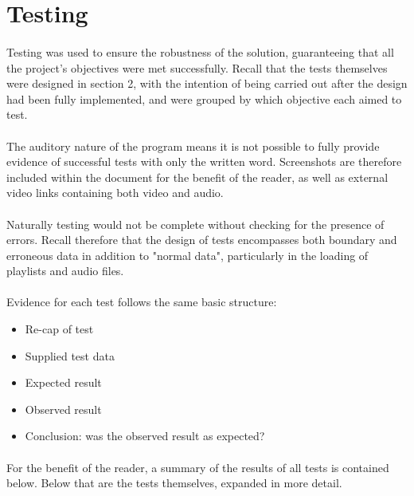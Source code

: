 \section {Testing}
\paragraph{}
Testing was used to ensure the robustness of the solution, guaranteeing that all the project's objectives were met successfully. Recall that the tests themselves were designed in section 2, with the intention of being carried out after the design had been fully implemented, and were grouped by which objective each aimed to test.

\paragraph{}
The auditory nature of the program means it is not possible to fully provide evidence of successful tests with only the written word. Screenshots are therefore included within the document for the benefit of the reader, as well as external video links containing both video and audio.

\paragraph{}
Naturally testing would not be complete without checking for the presence of errors. Recall therefore that the design of tests encompasses both boundary and erroneous data in addition to "normal data", particularly in the loading of playlists and audio files.

\paragraph{}
Evidence for each test follows the same basic structure:
\begin{itemize}
	\item Re-cap of test
	\item Supplied test data
	\item Expected result
	\item Observed result
	\item Conclusion: was the observed result as expected?
\end{itemize}

\paragraph{}
For the benefit of the reader, a summary of the results of all tests is contained below.
Below that are the tests themselves, expanded in more detail.

